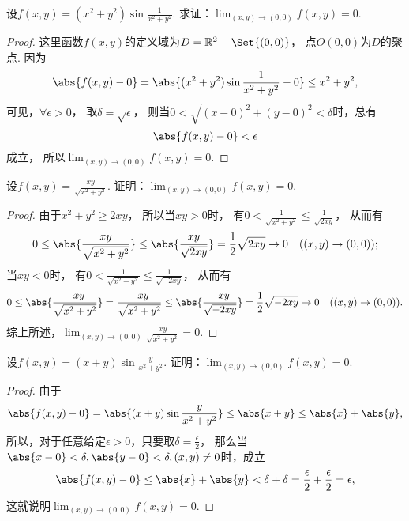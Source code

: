 \begin{example}
设\(f(x,y) = (x^2+y^2) \sin\frac1{x^2+y^2}\).
求证：\(\lim_{(x,y)\to(0,0)} f(x,y) = 0\).
\begin{proof}
这里函数\(f(x,y)\)的定义域为\(D = \mathbb{R}^2 - \Set{(0,0)}\)，
点\(O(0,0)\)为\(D\)的聚点.
因为\begin{equation*}
	\abs{f(x,y)-0}
	= \abs{(x^2+y^2) \sin\frac1{x^2+y^2} - 0}
	\leq x^2+y^2,
\end{equation*}
可见，\(\forall\epsilon>0\)，
取\(\delta=\sqrt{\epsilon}\)，
则当\(0 < \sqrt{(x-0)^2+(y-0)^2} < \delta\)时，总有\begin{equation*}
	\abs{f(x,y)-0} < \epsilon
\end{equation*}成立，
所以\(\lim_{(x,y)\to(0,0)} f(x,y) = 0\).
\end{proof}
\end{example}

\begin{example}
设\(f(x,y) = \frac{xy}{\sqrt{x^2+y^2}}\).
证明：\(\lim_{(x,y)\to(0,0)} f(x,y) = 0\).
\begin{proof}
由于\(x^2+y^2 \geq 2xy\)，
所以当\(xy>0\)时，
有\(0 < \frac1{\sqrt{x^2+y^2}} \leq \frac1{\sqrt{2xy}}\)，
从而有\begin{equation*}
	0 \leq \abs{\frac{xy}{\sqrt{x^2+y^2}}}
	\leq \abs{\frac{xy}{\sqrt{2xy}}}
	= \frac12 \sqrt{2xy}
	\to0
	\quad((x,y)\to(0,0));
\end{equation*}
当\(xy<0\)时，
有\(0 < \frac1{\sqrt{x^2+y^2}} \leq \frac1{\sqrt{-2xy}}\)，
从而有\begin{equation*}
	0 \leq \abs{\frac{-xy}{\sqrt{x^2+y^2}}}
	= \frac{-xy}{\sqrt{x^2+y^2}}
	\leq \abs{\frac{-xy}{\sqrt{-2xy}}}
	= \frac12 \sqrt{-2xy}
	\to0
	\quad((x,y)\to(0,0)).
\end{equation*}
综上所述，\(\lim_{(x,y)\to(0,0)} \frac{xy}{\sqrt{x^2+y^2}} = 0\).
\end{proof}
\end{example}

\begin{example}
设\(f(x,y) = (x+y) \sin\frac{y}{x^2+y^2}\).
证明：\(\lim_{(x,y)\to(0,0)} f(x,y) = 0\).
\begin{proof}
由于\begin{equation*}
	\abs{f(x,y)-0}
	= \abs{(x+y) \sin\frac{y}{x^2+y^2}}
	\leq \abs{x+y}
	\leq \abs{x}+\abs{y},
\end{equation*}
所以，对于任意给定\(\epsilon>0\)，只要取\(\delta=\frac\epsilon2\)，
那么当\(\abs{x-0}<\delta,\abs{y-0}<\delta,(x,y)\neq0\)时，成立\begin{equation*}
	\abs{f(x,y)-0}
	\leq \abs{x}+\abs{y}
	< \delta+\delta
	= \frac\epsilon2+\frac\epsilon2
	= \epsilon,
\end{equation*}
这就说明\(\lim_{(x,y)\to(0,0)} f(x,y) = 0\).
\end{proof}
\end{example}

